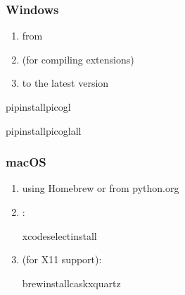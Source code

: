 \documentclass[a4paper,10pt,english,openany,oneside]{sphinxmanual}
\begin{document}
\subsubsection{Windows}
\label{\detokenize{installation:windows}}\begin{enumerate}
%
\item {} 
\sphinxAtStartPar
{} from 

\item {} 
\sphinxAtStartPar
{} (for compiling extensions)

\item {} 
\sphinxAtStartPar
{} to the latest version

\end{enumerate}

\begin{sphinxVerbatim}[commandchars=\\\{\}]
pipinstallpicogl

pipinstallpicogl\PYG{o}{[}all\PYG{o}{]}
\end{sphinxVerbatim}


\subsubsection{macOS}
\label{\detokenize{installation:macos}}\begin{enumerate}
%
\item {} 
\sphinxAtStartPar
{} using Homebrew or from python.org

\item {} 
\sphinxAtStartPar
{}:

\begin{sphinxVerbatim}[commandchars=\\\{\}]
xcode\PYGZhy{}select\PYGZhy{}\PYGZhy{}install
\end{sphinxVerbatim}

\item {} 
\sphinxAtStartPar
{} (for X11 support):

\begin{sphinxVerbatim}[commandchars=\\\{\}]
brewinstall\PYGZhy{}\PYGZhy{}caskxquartz
\end{sphinxVerbatim}

\end{enumerate}
\end{document}
